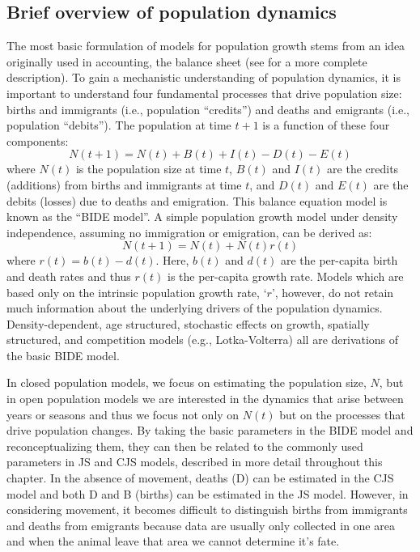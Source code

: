 \subsection{Brief overview of population dynamics}

The most basic formulation of models for population growth stems from
an idea originally used in accounting, the balance sheet (see
\citet[][Chapt. 3]{conroy_carroll:2009} for a more complete
description).  To gain a mechanistic understanding of population
dynamics, it is important to understand four fundamental processes
that drive population size: births and immigrants (i.e., population
``credits'') and deaths and emigrants (i.e., population ``debits'').
The population at time $t+1$ is a function of these four components:
\[
N(t+1) = N(t) + B(t) + I(t) - D(t) - E(t)
\]
where $N(t)$ is the population size at time $t$, $B(t)$ and $I(t)$ are
the credits (additions) from births and immigrants at time $t$, and
$D(t)$ and $E(t)$ are the debits (losses) due to deaths and
emigration.  This balance equation model is known as the ``BIDE
model''.  A simple population growth model under density independence,
assuming no immigration or emigration, can be derived as:
\[
N(t+1) = N(t) + N(t)r(t)
\]
where $r(t) = b(t) - d(t)$.  Here, $b(t)$ and $d(t)$ are the
per-capita birth and death rates and thus $r(t)$ is the per-capita
growth rate. Models which are based only on the intrinsic population
growth rate, `$r$', however, do not retain much information about the
underlying drivers of the population dynamics.  Density-dependent, age
structured, stochastic effects on growth, spatially structured, and
competition models (e.g., Lotka-Volterra) all are derivations of the
basic BIDE model.

In closed population models, we focus on estimating the population
size, $N$, but in open population models we are interested in the
dynamics that arise between years or seasons and thus we focus not
only on $N(t)$ but on the processes that drive population changes.
By taking the basic parameters in the BIDE model and reconceptualizing
them, they can then be related to the commonly used parameters in JS
and CJS models, described in more detail throughout this chapter. In
the absence of movement, deaths (D) can be estimated in the CJS model
and both D and B (births) can be estimated in the JS model.  However,
in considering movement, it becomes difficult to distinguish births
from immigrants and deaths from emigrants because data are usually only 
collected in one area and when the animal leave that area we 
cannot determine it's fate.
 
